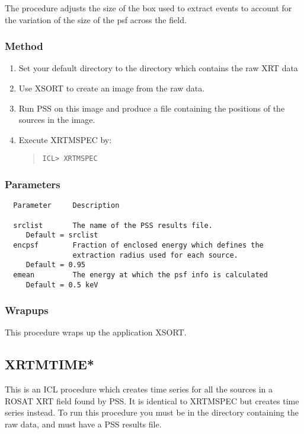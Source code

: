 \documentclass{book}
\renewcommand{\_}{{\tt\char'137}}     %
\begin{document}
The procedure adjusts the size of the box used to extract events
to account for the variation of the size of the psf across the field.

\subsubsection{Method}

\begin{enumerate}
\item Set your default directory to the directory which contains
the raw XRT data
\item Use XSORT to create an image from the raw data.
\item Run PSS on this image and produce a file containing the
positions of the sources in the image.
\item Execute XRTMSPEC by:
\begin{quote}\begin{verbatim}
ICL> XRTMSPEC
\end{verbatim}\end{quote}
\end{enumerate}
\subsubsection{Parameters}
\begin{verbatim}
  Parameter     Description

  srclist       The name of the PSS results file.
     Default = srclist
  encpsf        Fraction of enclosed energy which defines the
                extraction radius used for each source.
     Default = 0.95
  emean         The energy at which the psf info is calculated
     Default = 0.5 keV

\end{verbatim}\subsubsection{Wrapups}
This procedure wraps up the application XSORT.

\subsection{XRTMTIME*}
This is an ICL procedure which creates time series for all the sources
in a ROSAT XRT field found by PSS. It is identical to XRTMSPEC but
creates time series instead. To run this procedure you must be in the
directory containing the raw data, and must have a PSS results file.
\end{document}
